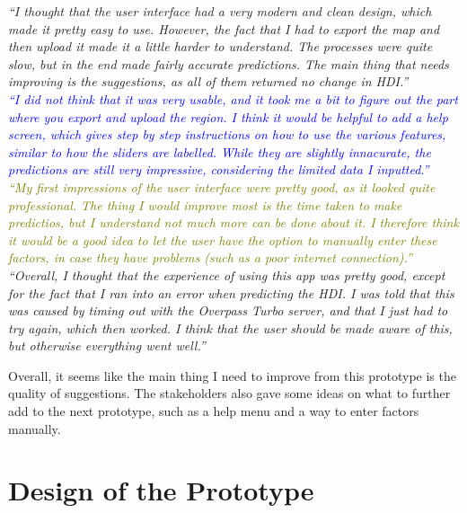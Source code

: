 \documentclass[12pt]{report}
\begin{document}
\begin{flushright}
\textit{\textcolor{Sepia}{``I thought that the user interface had a very modern and clean design, which made it pretty easy to use. However, the fact that I had to export the map and then upload it made it a little harder to understand. The processes were quite slow, but in the end made fairly accurate predictions. The main thing that needs improving is the suggestions, as all of them returned no change in HDI.''}} \\
\textit{\textcolor{Blue}{``I did not think that it was very usable, and it took me a bit to figure out the part where you export and upload the region. I think it would be helpful to add a help screen, which gives step by step instructions on how to use the various features, similar to how the sliders are labelled. While they are slightly innacurate, the predictions are still very impressive, considering the limited data I inputted.''}} \\
\textit{\textcolor{olive}{``My first impressions of the user interface were pretty good, as it looked quite professional. The thing I would improve most is the time taken to make predictios, but I understand not much more can be done about it. I therefore think it would be a good idea to let the user have the option to manually enter these factors, in case they have problems (such as a poor internet connection).''}} \\
\textit{\textcolor{OliveGreen}{``Overall, I thought that the experience of using this app was pretty good, except for the fact that I ran into an error when predicting the HDI. I was told that this was caused by timing out with the Overpass Turbo server, and that I just had to try again, which then worked. I think that the user should be made aware of this, but otherwise everything went well.''}}
\end{flushright}

Overall, it seems like the main thing I need to improve from this prototype is the quality of suggestions. The stakeholders also gave some ideas on what to further add to the next prototype, such as a help menu and a way to enter factors manually.

\chapter{Design of the  Prototype}
\end{document}
